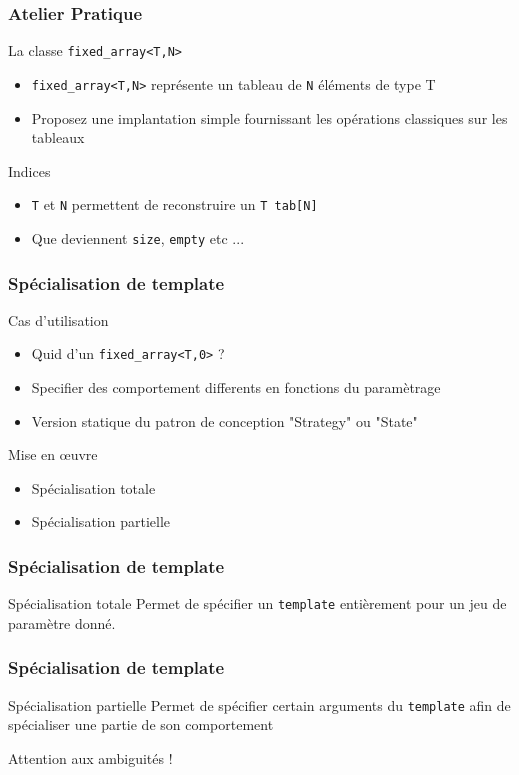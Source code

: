 \documentclass[svgnames]{beamer}
\begin{document}
\frame
{
  \frametitle{Atelier Pratique}
  \begin{block}{La classe \texttt{fixed\_array<T,N>}}
  \begin{itemize}
  \item \texttt{fixed\_array<T,N>} représente un tableau de \texttt{N} éléments de type T
  \item Proposez une implantation simple fournissant les opérations classiques sur les tableaux
  \end{itemize}
  \end{block}

  \begin{block}{Indices}
  \begin{itemize}
  \item \texttt{T} et \texttt{N} permettent de reconstruire un \texttt{T tab[N]}
  \item Que deviennent \texttt{size}, \texttt{empty} etc ...
  \end{itemize}
  \end{block}
}

\frame
{
  \frametitle{Spécialisation de template}
  \begin{block}{Cas d'utilisation}
  \begin{itemize}
  \item Quid d'un \texttt{fixed\_array<T,0>} ?
  \item Specifier des comportement differents en fonctions du paramètrage
  \item Version statique du patron de conception "Strategy" ou "State"
  \end{itemize}
  \end{block}

  \begin{block}{Mise en \oe{uvre}}
  \begin{itemize}
  \item Spécialisation totale
  \item Spécialisation partielle
  \end{itemize}
  \end{block}{}
}

\frame
{
  \frametitle{Spécialisation de template}
  \begin{block}{Spécialisation totale}
  Permet de spécifier un \texttt{template} entièrement pour un jeu de paramètre donné.
  \vspace{0.5cm}
  \lstemptypair
  \end{block}
}

\frame
{
  \frametitle{Spécialisation de template}
  \begin{block}{Spécialisation partielle}
  Permet de spécifier certain arguments du \texttt{template} afin de spécialiser une partie de son comportement
  \lstpartialspec
  \begin{center}\alert{Attention aux ambiguités !}\end{center}
  \end{block}
}
\end{document}
